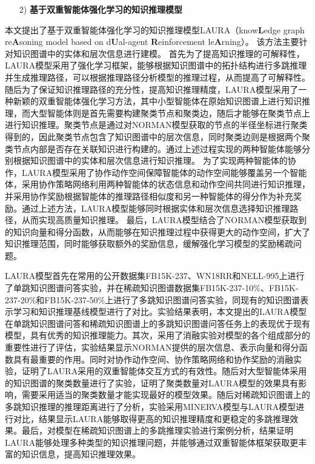 \documentclass[algorithmlist, AutoFakeBold, AutoFakeSlant, figurelist, tablelist, nomlist, engineering, openany]{seuthesix} %
\begin{document}
\begin{itemize}[leftmargin=*]
  \item [2)]\textbf{基于双重智能体强化学习的知识推理模型}
\end{itemize}


本文提出了基于双重智能体强化学习的知识推理模型LAURA（know\textbf{L}edge graph re\textbf{A}soning model based on d\textbf{U}al-agent \textbf{R}einforcement le\textbf{A}rning）。
该方法主要针对知识图谱中的实体和层次信息进行建模。
首先为了提高知识推理的可解释性，LAURA模型采用了强化学习框架，能够根据知识图谱中的拓扑结构进行多跳推理并生成推理路径，可以根据推理路径分析模型的推理过程，从而提高了可解释性。
随后为了保证知识推理路径的充分性，提高知识推理精度，LAURA模型采用了一种新颖的双重智能体强化学习方法，其中小型智能体在原始知识图谱上进行知识推理，而大型智能体则是首先需要构建聚类节点和聚类边，随后才能够在聚类节点上进行知识推理。聚类节点是通过对NORMAN模型获取的节点的半径坐标进行聚类得到的，因此聚类节点包含了知识图谱中的层次信息，同时聚类边则是根据两个聚类节点内部是否存在关联知识进行构建的。通过上述过程实现的两种智能体能够分别根据知识图谱中的实体和层次信息进行知识推理。
为了实现两种智能体的协作，LAURA模型采用了协作动作空间保障智能体的动作空间能够覆盖另一个智能体，采用协作策略网络利用两种智能体的状态信息和动作空间共同进行知识推理，并采用协作奖励根据智能体的推理路径相似度和另一种智能体的得分作为补充奖励。通过上述方法，LAURA模型能够同时根据实体和层次信息选择知识推理路径，从而实现高质量知识推理。
最后，LAURA模型结合了NORMAN模型获取到的知识向量和得分函数，从而能够在知识推理过程中获得更大的动作空间，扩大了知识推理范围，同时能够获取额外的奖励信息，缓解强化学习模型的奖励稀疏问题。

LAURA模型首先在常用的公开数据集FB15K-237、WN18RR和NELL-995上进行了单跳知识图谱问答实验，并在稀疏知识图谱数据集FB15K-237-10\%、FB15K-237-20\%和FB15K-237-50\%上进行了多跳知识图谱问答实验，同现有的知识图谱表示学习和知识推理基线模型进行了对比。实验结果表明，本文提出的LAURA模型在单跳知识图谱问答和稀疏知识图谱上的多跳知识图谱问答任务上的表现优于现有模型，具有优秀的知识推理能力。其次，采用了消融实验对模型的各个组成部分的重要性进行了评估，实验结果显示NORMAN提供的层次信息、表示向量和得分函数具有最重要的作用。同时对协作动作空间、协作策略网络和协作奖励的消融实验，证明了LAURA采用的双重智能体交互方式的有效性。随后对大型智能体采用的知识图谱的聚类数量进行了实验，证明了聚类数量对LAURA模型的效果具有影响，需要采用适当的聚类数量才能实现最好的模型效果。随后对稀疏知识图谱上的多跳知识推理的推理距离进行了分析，实验采用MINERVA模型与LAURA模型进行对比，结果显示LAURA能够取得更高的知识推理精度和更稳定的多跳推理效果。最后，对模型在稀疏知识图谱上的多跳推理实验进行案例分析，结果证明LAURA能够处理多种类型的知识推理问题，并能够通过双重智能体框架获取更丰富的知识信息，提高知识推理效果。
\end{document}
